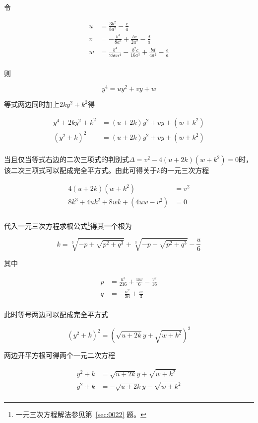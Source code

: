 令

\begin{align*}
  u &= \frac{3b^2}{8a^2} - \frac ca \\
  v &= -\frac{b^3}{8a^3} + \frac{bc}{2a^2} - \frac da \\
  w &= \frac{b^4}{256a^4} - \frac{b^2c}{16a^3} + \frac{bd}{4a^2} - \frac ea \\
\end{align*}

则

\[ y^4 = uy^2 + vy + w \]

等式两边同时加上$2ky^2 + k^2$得

\begin{align*}
  y^4 + 2ky^2 + k^2 &= (u + 2k)y^2 + vy + (w + k^2) \\
  (y^2 + k)^2 &= (u + 2k)y^2 + vy + (w + k^2) \\
\end{align*}

当且仅当等式右边的二次三项式的判别式$\Delta = v^2 - 4(u + 2k)(w + k^2) = 0$时，该二次三项式可以配成完全平方式。由此可得关于$k$的一元三次方程

\begin{align*}
  4(u + 2k)(w + k^2) &= v^2 \\
  8k^3 + 4uk^2 + 8wk + (4uw - v^2) &= 0 \\
\end{align*}

代入一元三次方程求根公式\footnote{一元三次方程解法参见第~\ref{sec:0022} 题。}得其一个根为

\[ k = \sqrt[3]{-p + \sqrt{p^2 + q^3}} + \sqrt[3]{-p - \sqrt{p^2 + q^3}} - \frac u6 \]

其中

\begin{align*}
  p &= \frac{u^3}{216} + \frac{uw}6 - \frac{v^2}{16} \\
  q &= -\frac{u^2}{36} + \frac w3 \\
\end{align*}

此时等号两边可以配成完全平方式

\[ (y^2 + k)^2 = \left(\sqrt{u + 2k}y + \sqrt{w + k^2}\right)^2 \]

两边开平方根可得两个一元二次方程

\begin{align*}
  y^2 + k &= \sqrt{u + 2k}y + \sqrt{w + k^2} \\
  y^2 + k &= -\sqrt{u + 2k}y - \sqrt{w + k^2} \\
\end{align*}

